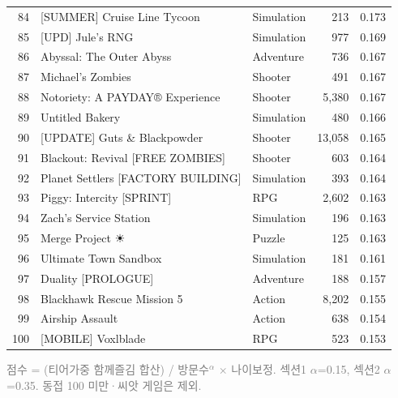 \documentclass[10pt]{article}
\begin{document}
\begin{longtable}{r l l r r}
84 & [SUMMER] Cruise Line Tycoon & Simulation & 213 & 0.173 \\
85 & [UPD] Jule's RNG & Simulation & 977 & 0.169 \\
86 & Abyssal: The Outer Abyss & Adventure & 736 & 0.167 \\
87 & Michael's Zombies & Shooter & 491 & 0.167 \\
88 & Notoriety: A PAYDAY® Experience & Shooter & 5,380 & 0.167 \\
89 & Untitled Bakery & Simulation & 480 & 0.166 \\
90 & [UPDATE] Guts \& Blackpowder & Shooter & 13,058 & 0.165 \\
91 & Blackout: Revival [FREE ZOMBIES] & Shooter & 603 & 0.164 \\
92 & Planet Settlers [FACTORY BUILDING] & Simulation & 393 & 0.164 \\
93 & Piggy: Intercity [SPRINT] & RPG & 2,602 & 0.163 \\
94 & Zach's Service Station & Simulation & 196 & 0.163 \\
95 & Merge Project ☀ & Puzzle & 125 & 0.163 \\
96 & Ultimate Town Sandbox & Simulation & 181 & 0.161 \\
97 & Duality [PROLOGUE] & Adventure & 188 & 0.157 \\
98 & Blackhawk Rescue Mission 5 & Action & 8,202 & 0.155 \\
99 & Airship Assault & Action & 638 & 0.154 \\
100 & [MOBILE] Voxlblade & RPG & 523 & 0.153 \\
\bottomrule
\end{longtable}

\vspace{4mm}
\noindent\small\textcolor{gray}{점수 = (티어가중 함께즐김 합산) / 방문수$^\alpha$ $\times$ 나이보정.
섹션1 $\alpha$=0.15, 섹션2 $\alpha$=0.35. 동접 100 미만·씨앗 게임은 제외.}
\end{document}
